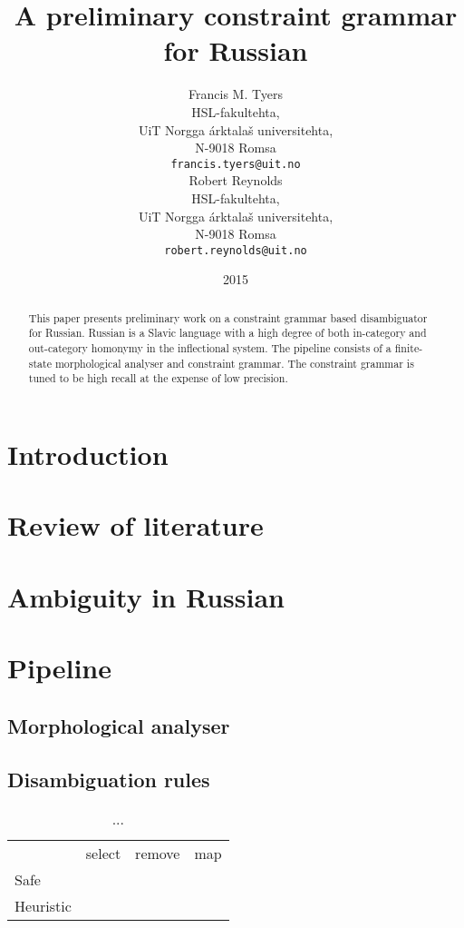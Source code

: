 \documentclass[11pt]{article}
\title{A preliminary constraint grammar for Russian}
\author{Francis M. Tyers \\
  HSL-fakultehta, \\
  UiT Norgga árktalaš universitehta, \\
  N-9018 Romsa \\
  {\tt francis.tyers@uit.no} \\\And
  Robert Reynolds \\
  HSL-fakultehta, \\
  UiT Norgga árktalaš universitehta, \\
  N-9018 Romsa \\
  {\tt robert.reynolds@uit.no} \\}
\date{2015}
\begin{document}
\maketitle
\begin{abstract}
 This paper presents preliminary work on a constraint
 grammar based disambiguator for Russian. Russian is
 a Slavic language with a high degree of both in-category
 and out-category homonymy in the inflectional system.
 The pipeline consists of a finite-state morphological
 analyser and constraint grammar. The constraint 
 grammar is tuned to be high recall at the expense of 
 low precision.
\end{abstract}

\section{Introduction}

\cite{Karlsson-90}


\section{Review of literature}
% 

\cite{trosterud2009}

\section{Ambiguity in Russian}

\section{Pipeline}

\subsection{Morphological analyser}

\cite{yablonsky1999russian}

\subsection{Disambiguation rules}

\begin{table}
  \centering
  \begin{tabular}{lrrr}
    \hline
         & {\sc select} & {\sc remove} & {\sc map} \\
    Safe & & & \\
    
    Heuristic &  & & \\
    \hline
  \end{tabular}
  \caption{...}
\end{table}
\end{document}
